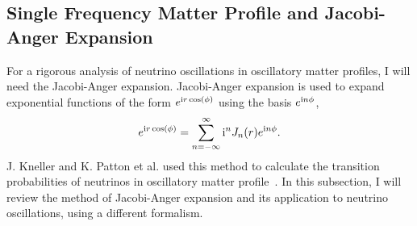 \subsection{\label{chap:matter-sec:single-revisted}Single Frequency Matter Profile and Jacobi-Anger Expansion}


For a rigorous analysis of neutrino oscillations in oscillatory matter profiles, I will need the Jacobi-Anger expansion. Jacobi-Anger expansion is used to expand exponential functions of the form $e^{\mathrm{i} r \cos (\phi)}$ using the basis $e^{\mathrm{i} n \phi }$,
\begin{equation}
e^{\mathrm{i} r \cos (\phi)} = \sum_{n=-\infty}^\infty \mathrm{i}^n J_n(r) e^{\mathrm{i} n\phi}.
\end{equation}
J. Kneller and K. Patton et al. used this method to calculate the transition probabilities of neutrinos in oscillatory matter profile~\cite{Kneller2010,Kneller2013,Patton2014}. In this subsection, I will review the method of Jacobi-Anger expansion and its application to neutrino oscillations, using a different formalism. 



